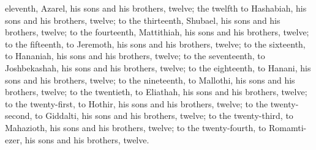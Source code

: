 \begin{biblechapter}
\verse eleventh, Azarel, his sons and his brothers, twelve;
\verse the twelfth to Hashabiah, his sons and his brothers, twelve;
\verse to the thirteenth, Shubael, his sons and his brothers, twelve;
\verse to the fourteenth, Mattithiah, his sons and his brothers, twelve;
\verse to the fifteenth, to Jeremoth, his sons and his brothers, twelve;
\verse to the sixteenth, to Hananiah, his sons and his brothers, twelve;
\verse to the seventeenth, to Joshbekashah, his sons and his brothers, twelve;
\verse to the eighteenth, to Hanani, his sons and his brothers, twelve;
\verse to the nineteenth, to Mallothi, his sons and his brothers, twelve;
\verse to the twentieth, to Eliathah, his sons and his brothers, twelve;
\verse to the twenty-first, to Hothir, his sons and his brothers, twelve;
\verse to the twenty-second, to Giddalti, his sons and his brothers, twelve;
\verse to the twenty-third, to Mahazioth, his sons and his brothers, twelve;
\verse to the twenty-fourth, to Romamti-ezer, his sons and his brothers, twelve.
\end{biblechapter}

